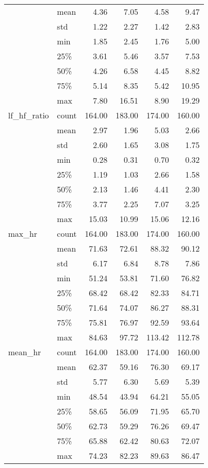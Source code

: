 \begin{tabular}{llrrrr}
        & mean &    4.36 &    7.05 &    4.58 &    9.47 \\
        & std &    1.22 &    2.27 &    1.42 &    2.83 \\
        & min &    1.85 &    2.45 &    1.76 &    5.00 \\
        & 25\% &    3.61 &    5.46 &    3.57 &    7.53 \\
        & 50\% &    4.26 &    6.58 &    4.45 &    8.82 \\
        & 75\% &    5.14 &    8.35 &    5.42 &   10.95 \\
        & max &    7.80 &   16.51 &    8.90 &   19.29 \\
lf\_hf\_ratio & count &  164.00 &  183.00 &  174.00 &  160.00 \\
        & mean &    2.97 &    1.96 &    5.03 &    2.66 \\
        & std &    2.60 &    1.65 &    3.08 &    1.75 \\
        & min &    0.28 &    0.31 &    0.70 &    0.32 \\
        & 25\% &    1.19 &    1.03 &    2.66 &    1.58 \\
        & 50\% &    2.13 &    1.46 &    4.41 &    2.30 \\
        & 75\% &    3.77 &    2.25 &    7.07 &    3.25 \\
        & max &   15.03 &   10.99 &   15.06 &   12.16 \\
max\_hr & count &  164.00 &  183.00 &  174.00 &  160.00 \\
        & mean &   71.63 &   72.61 &   88.32 &   90.12 \\
        & std &    6.17 &    6.84 &    8.78 &    7.86 \\
        & min &   51.24 &   53.81 &   71.60 &   76.82 \\
        & 25\% &   68.42 &   68.42 &   82.33 &   84.71 \\
        & 50\% &   71.64 &   74.07 &   86.27 &   88.31 \\
        & 75\% &   75.81 &   76.97 &   92.59 &   93.64 \\
        & max &   84.63 &   97.72 &  113.42 &  112.78 \\
mean\_hr & count &  164.00 &  183.00 &  174.00 &  160.00 \\
        & mean &   62.37 &   59.16 &   76.30 &   69.17 \\
        & std &    5.77 &    6.30 &    5.69 &    5.39 \\
        & min &   48.54 &   43.94 &   64.21 &   55.05 \\
        & 25\% &   58.65 &   56.09 &   71.95 &   65.70 \\
        & 50\% &   62.73 &   59.29 &   76.26 &   69.47 \\
        & 75\% &   65.88 &   62.42 &   80.63 &   72.07 \\
        & max &   74.23 &   82.23 &   89.63 &   86.47 \\
\bottomrule
\end{tabular}
